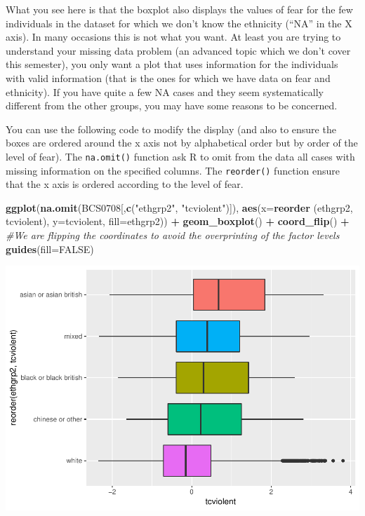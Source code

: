 \documentclass[]{book}
\newenvironment{Shaded}{\begin{snugshade}}{\end{snugshade}}
\newcommand{\CommentTok}[1]{\textcolor[rgb]{0.56,0.35,0.01}{\textit{#1}}}
\newcommand{\DataTypeTok}[1]{\textcolor[rgb]{0.13,0.29,0.53}{#1}}
\newcommand{\KeywordTok}[1]{\textcolor[rgb]{0.13,0.29,0.53}{\textbf{#1}}}
\newcommand{\NormalTok}[1]{#1}
\newcommand{\OperatorTok}[1]{\textcolor[rgb]{0.81,0.36,0.00}{\textbf{#1}}}
\newcommand{\OtherTok}[1]{\textcolor[rgb]{0.56,0.35,0.01}{#1}}
\newcommand{\StringTok}[1]{\textcolor[rgb]{0.31,0.60,0.02}{#1}}
\theoremstyle{definition}
\theoremstyle{definition}
\theoremstyle{definition}
\theoremstyle{remark}
\begin{document}
What you see here is that the boxplot also displays the values of fear
for the few individuals in the dataset for which we don't know the
ethnicity (``NA'' in the X axis). In many occasions this is not what you
want. At least you are trying to understand your missing data problem
(an advanced topic which we don't cover this semester), you only want a
plot that uses information for the individuals with valid information
(that is the ones for which we have data on fear and ethnicity). If you
have quite a few NA cases and they seem systematically different from
the other groups, you may have some reasons to be concerned.

You can use the following code to modify the display (and also to ensure
the boxes are ordered around the x axis not by alphabetical order but by
order of the level of fear). The \texttt{na.omit()} function ask R to
omit from the data all cases with missing information on the specified
columns. The \texttt{reorder()} function ensure that the x axis is
ordered according to the level of fear.

\begin{Shaded}
\begin{Highlighting}[]
\KeywordTok{ggplot}\NormalTok{(}\KeywordTok{na.omit}\NormalTok{(BCS0708[,}\KeywordTok{c}\NormalTok{(}\StringTok{"ethgrp2"}\NormalTok{, }\StringTok{"tcviolent"}\NormalTok{)]), }\KeywordTok{aes}\NormalTok{(}\DataTypeTok{x=}\KeywordTok{reorder}\NormalTok{ (ethgrp2, tcviolent), }\DataTypeTok{y=}\NormalTok{tcviolent, }\DataTypeTok{fill=}\NormalTok{ethgrp2)) }\OperatorTok{+}
\StringTok{  }\KeywordTok{geom_boxplot}\NormalTok{() }\OperatorTok{+}
\StringTok{  }\KeywordTok{coord_flip}\NormalTok{() }\OperatorTok{+}\StringTok{ }\CommentTok{#We are flipping the coordinates to avoid the overprinting of the factor levels}
\StringTok{  }\KeywordTok{guides}\NormalTok{(}\DataTypeTok{fill=}\OtherTok{FALSE}\NormalTok{)}
\end{Highlighting}
\end{Shaded}

\includegraphics{06-hypothesis_testing_files/figure-latex/unnamed-chunk-6-1.pdf}
\end{document}
